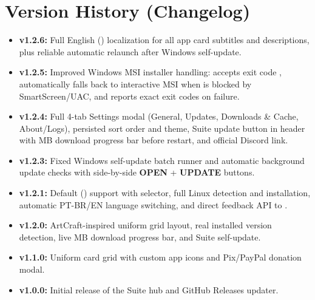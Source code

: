 \documentclass[11pt,a4paper]{article}
\begin{document}
\section{Version History (Changelog)}
\begin{itemize}
  \item \textbf{v1.2.6:} Full English () localization for all app card subtitles and descriptions, plus reliable automatic relaunch after Windows self-update.
  \item \textbf{v1.2.5:} Improved Windows MSI installer handling: accepts exit code , automatically falls back to interactive MSI when  is blocked by SmartScreen/UAC, and reports exact exit codes on failure.
  \item \textbf{v1.2.4:} Full 4-tab Settings modal (General, Updates, Downloads \& Cache, About/Logs), persisted sort order and theme, Suite update button in header with MB download progress bar before restart, and official Discord link.
  \item \textbf{v1.2.3:} Fixed Windows self-update batch runner and automatic background update checks with side-by-side \textbf{OPEN} + \textbf{UPDATE} buttons.
  \item \textbf{v1.2.1:} Default  () support with  selector, full Linux  detection and installation, automatic PT-BR/EN language switching, and direct feedback API to .
  \item \textbf{v1.2.0:} ArtCraft-inspired uniform grid layout, real installed version detection, live MB download progress bar, and Suite self-update.
  \item \textbf{v1.1.0:} Uniform card grid with custom app icons and Pix/PayPal donation modal.
  \item \textbf{v1.0.0:} Initial release of the Suite hub and GitHub Releases updater.
\end{itemize}
\end{document}
